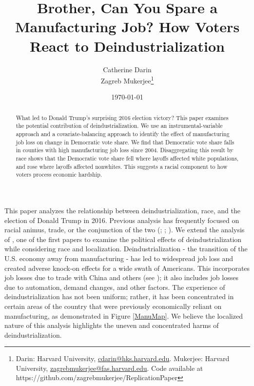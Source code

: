 \documentclass[]{AEA}
\begin{document}
\title{Brother, Can You Spare a Manufacturing Job? How Voters React to
Deindustrialization}


\author{
  Catherine Darin\\
  Zagreb Mukerjee\thanks{
  Darin: Harvard University, \href{mailto:cdarin@hks.harvard.edu}{cdarin@hks.harvard.edu}.
  Mukerjee: Harvard University, \href{mailto:zagrebmukerjee@fas.harvard.edu}{zagrebmukerjee@fas.harvard.edu}.
  Code available at https://github.com/zagrebmukerjee/ReplicationPaper
}
}

\date{\today}
\pubVolume{}
\pubIssue{}
\JEL{}
\Keywords{}

\begin{abstract}
What led to Donald Trump's surprising 2016 election victory? This paper
examines the potential contribution of deindustrialization. We use an
instrumental-variable approach and a covariate-balancing approach to
identify the effect of manufacturing job loss on change in Democratic
vote share. We find that Democratic vote share falls in counties with
high manufacturing job loss since 2004. Disaggregating this result by
race shows that the Democratic vote share fell where layoffs affected
white populations, and rose where layoffs affected nonwhites. This
suggests a racial component to how voters process economic hardship.
\end{abstract}


\maketitle

This paper analyzes the relationship between deindustrialization, race,
and the election of Donald Trump in 2016. Previous analysis has
frequently focused on racial animus, trade, or the conjunction of the
two (\cite{Autor20}; \cite{Che16}; \cite{BR21}). We extend the analysis
of \cite{Baccini21}, one of the first papers to examine the political
effects of deindustrialization while considering race and localization.
Deindustrialization - the transition of the U.S. economy away from
manufacturing - has led to widespread job loss and created adverse
knock-on effects for a wide swath of Americans. This incorporates job
losses due to trade with China and others (see \cite{Acemoglu16}); it
also includes job losses due to automation, demand changes, and other
factors. The experience of deindustrialization has not been uniform;
rather, it has been concentrated in certain areas of the country that
were previously economically reliant on manufacturing, as demonstrated
in Figure \ref{ManuMap}. We believe the localized nature of this
analysis highlights the uneven and concentrated harms of
deindustrialization.
\end{document}
